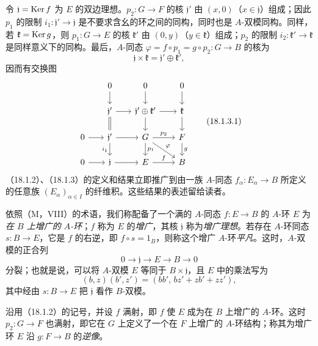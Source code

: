 令 $\mathfrak j=\operatorname{Ker} f$ 为 $E$ 的双边理想。$p_2:G\to F$ 的核 $\mathfrak j'$ 由 $(x,0)$（$x\in\mathfrak j$）组成；因此 $p_1$ 的限制 $i_1:\mathfrak j'\to\mathfrak j$ 是不要求含幺的环之间的同构，同时也是 $A$-双模同构。同样，若 $\mathfrak k=\operatorname{Ker} g$，则 $p_1:G\to E$ 的核 $\mathfrak k'$ 由 $(0,y)$（$y\in\mathfrak k$）组成；$p_2$ 的限制 $i_2:\mathfrak k'\to\mathfrak k$ 是同样意义下的同构。最后，$A$-同态 $\varphi=f\circ p_1=g\circ p_2:G\to B$ 的核为
\[
 \mathfrak j\times\mathfrak k=\mathfrak j'\oplus\mathfrak k',
\]
因而有交换图
\begin{equation}
\begin{tikzcd}[column sep=1.8em,row sep=1.5em]
 & 0\arrow[d] & 0\arrow[d] & 0\arrow[d]\\
 & \mathfrak j'\arrow[r]\arrow[d,equal] &
 \mathfrak j'\oplus\mathfrak k'\arrow[r]\arrow[d] &
 \mathfrak k\arrow[d]\\
 0\arrow[r] & \mathfrak j'\arrow[r]\arrow[d,"i_1"'] &
 G\arrow[r,"p_2"]\arrow[d,"p_1"]\arrow[dr,"\varphi",description] &
 F\arrow[d,"g"]\\
 0\arrow[r] & \mathfrak j\arrow[r] & E\arrow[r,"f"] & B
\end{tikzcd}
\tag{18.1.3.1}
\end{equation}
（18.1.2）、（18.1.3）的定义和结果立即推广到由一族 $A$-同态 $f_\alpha:E_\alpha\to B$ 所定义的任意族 $(E_\alpha)_{\alpha\in I}$ 的纤维积。这些结果的表述留给读者。

依照（M，VIII）的术语，我们称配备了一个满的 $A$-同态 $f:E\to B$ 的 $A$-环 $E$ 为\emph{在 $B$ 上增广的 $A$-环}；$f$ 称为 $E$ 的\emph{增广}，其核 $\mathfrak j$ 称为\emph{增广理想}。若存在 $A$-环同态 $s:B\to E$，它是 $f$ 的右逆，即 $f\circ s=1_B$，则称这个增广 $A$-环\emph{平凡}。这时，$A$-双模的正合列
\[
 0\longrightarrow\mathfrak j\longrightarrow E\longrightarrow B\longrightarrow0
\]
分裂；也就是说，可以将 $A$-双模 $E$ 等同于 $B\times\mathfrak j$，且 $E$ 中的乘法写为
\[
 (b,z)(b',z')=(bb',\,bz'+zb'+zz'),
\]
其中经由 $s:B\to E$ 把 $\mathfrak j$ 看作 $B$-双模。

沿用（18.1.2）的记号，并设 $f$ 满射，即 $f$ 使 $E$ 成为在 $B$ 上增广的 $A$-环。这时 $p_2:G\to F$ 也满射，即它在 $G$ 上定义了一个在 $F$ 上增广的 $A$-环结构；称其为增广环 $E$ 沿 $g:F\to B$ 的\emph{逆像}。

